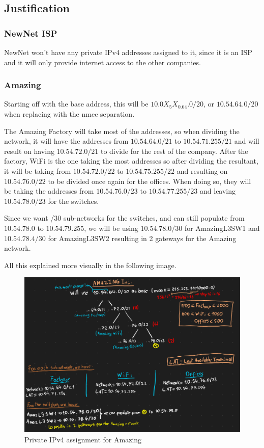 \documentclass{report}
\begin{document}
\subsection*{Justification}

\subsubsection*{NewNet ISP}
NewNet won't have any private IPv4 addresses assigned to it, since it is an ISP and it will only provide internet access to the other companies.

\subsubsection*{Amazing}
Starting off with the base address, this will be $10.0X_5X_0.64.0/20$, or $10.54.64.0/20$ when replacing with the nmec separation.

The Amazing Factory will take most of the addresses, so when dividing the network, it will have the addresses from $10.54.64.0/21$ to $10.54.71.255/21$ and will result on having $10.54.72.0/21$ to divide for the rest of the company. After the factory, WiFi is the one taking the most addresses so after dividing the resultant, it will be taking from $10.54.72.0/22$ to $10.54.75.255/22$ and resulting on $10.54.76.0/22$ to be divided once again for the offices. When doing so, they will be taking the addresses from $10.54.76.0/23$ to $10.54.77.255/23$ and leaving $10.54.78.0/23$ for the switches.

Since we want /30 sub-networks for the switches, and can still populate from $10.54.78.0$ to $10.54.79.255$, we will be using $10.54.78.0/30$ for AmazingL3SW1 and $10.54.78.4/30$ for AmazingL3SW2 resulting in 2 gateways for the Amazing network.

All this explained more visually in the following image.

\begin{figure}[H]
    \centering
    \includegraphics[width=\textwidth]{private-ipv4-amazing.png}
    \caption{Private IPv4 assignment for Amazing}
    \label{fig:private-ipv4-amazing}
\end{figure}
\end{document}
